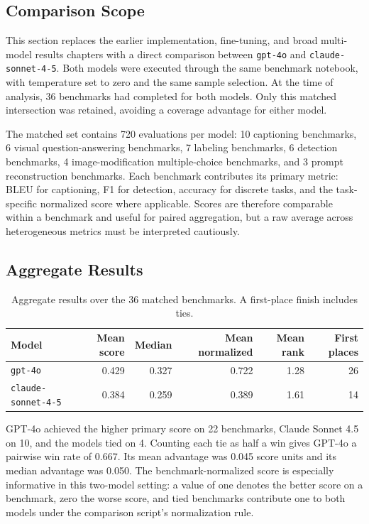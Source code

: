 ﻿\documentclass[11pt,a4paper]{article}
\begin{document}
\subsection{Comparison Scope}

This section replaces the earlier implementation, fine-tuning, and broad
multi-model results chapters with a direct comparison between
\texttt{gpt-4o} and \texttt{claude-sonnet-4-5}. Both models were executed
through the same benchmark notebook, with temperature set to zero and the
same sample selection. At the time of analysis, 36 benchmarks had completed
for both models. Only this matched intersection was retained, avoiding a
coverage advantage for either model.

The matched set contains 720 evaluations per model: 10 captioning benchmarks,
6 visual question-answering benchmarks, 7 labeling benchmarks, 6 detection
benchmarks, 4 image-modification multiple-choice benchmarks, and 3 prompt
reconstruction benchmarks. Each benchmark contributes its primary metric:
BLEU for captioning, F1 for detection, accuracy for discrete tasks, and the
task-specific normalized score where applicable. Scores are therefore
comparable within a benchmark and useful for paired aggregation, but a raw
average across heterogeneous metrics must be interpreted cautiously.

\subsection{Aggregate Results}

\begin{table}[H]
\centering
\small
\caption{Aggregate results over the 36 matched benchmarks. A first-place
finish includes ties.}
\label{tab:gpt4o-claude-overall}
\begin{tabularx}{\textwidth}{@{}Xrrrrr@{}}
\toprule
\textbf{Model} & \textbf{Mean score} & \textbf{Median} &
\textbf{Mean normalized} & \textbf{Mean rank} & \textbf{First places} \\
\midrule
\texttt{gpt-4o} & 0.429 & 0.327 & 0.722 & 1.28 & 26 \\
\texttt{claude-sonnet-4-5} & 0.384 & 0.259 & 0.389 & 1.61 & 14 \\
\bottomrule
\end{tabularx}
\end{table}

GPT-4o achieved the higher primary score on 22 benchmarks, Claude Sonnet 4.5
on 10, and the models tied on 4. Counting each tie as half a win gives GPT-4o
a pairwise win rate of 0.667. Its mean advantage was 0.045 score units and
its median advantage was 0.050. The benchmark-normalized score is especially
informative in this two-model setting: a value of one denotes the better
score on a benchmark, zero the worse score, and tied benchmarks contribute
one to both models under the comparison script's normalization rule.
\end{document}

